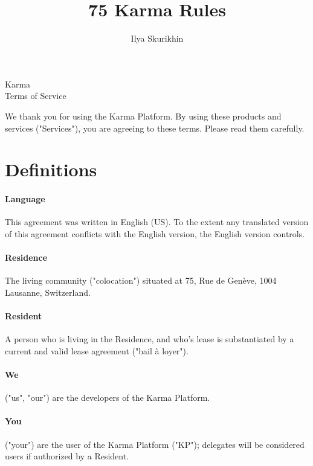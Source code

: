 \documentclass[12pt,a4paper]{article}
\author{Ilya Skurikhin}
\title{75 Karma Rules}
\begin{document}
\begin{center}
{\Huge Karma \\ \vspace{5mm} Terms of Service} \\
\end{center}

\vspace{5mm}

We thank you for using the Karma Platform. By using these products and services ("Services"), you are agreeing to these terms. Please read them carefully.

\section{Definitions}

\paragraph{Language}

This agreement was written in English (US). To the extent any translated version of this agreement conflicts with the English version, the English version controls.

\paragraph{Residence}

The living community ("colocation") situated at 75, Rue de Genève, 1004 Lausanne, Switzerland.

\paragraph{Resident}

A person who is living in the Residence, and who's lease is substantiated by a current and valid lease agreement ("bail à loyer").

\paragraph{We}

("us", "our") are the developers of the Karma Platform. 

\paragraph{You}

("your") are the user of the Karma Platform ("KP"); delegates will be considered users if authorized by a Resident.
	
\end{document}
